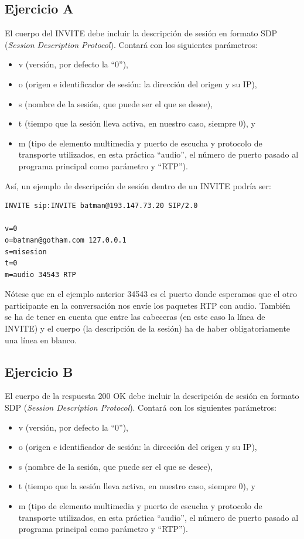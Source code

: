 \documentclass[a4paper,11pt]{article}
\begin{document}
\subsection*{Ejercicio A}

El cuerpo del INVITE debe incluir la descripción de sesión en formato SDP (\emph{Session Description Protocol}). Contará con los siguientes parámetros:

\begin{itemize}
  \item v (versión, por defecto la ``0''),
  \item o (origen e identificador de sesión: la dirección del origen y su IP),
  \item s (nombre de la sesión, que puede ser el que se desee),
  \item t (tiempo que la sesión lleva activa, en nuestro caso, siempre 0), y
  \item m (tipo de elemento multimedia y puerto de escucha y protocolo de transporte utilizados, en esta práctica ``audio'', el número de puerto pasado al programa principal como parámetro y ``RTP'').
\end{itemize}

Así, un ejemplo de descripción de sesión dentro de un INVITE podría ser:

\begin{verbatim}
INVITE sip:INVITE batman@193.147.73.20 SIP/2.0

v=0
o=batman@gotham.com 127.0.0.1
s=misesion
t=0
m=audio 34543 RTP
\end{verbatim}

Nótese que en el ejemplo anterior 34543 es el puerto donde esperamos que el otro participante en la conversación nos envíe los paquetes RTP con audio. También se ha de tener en cuenta que entre las cabeceras (en este caso la línea de INVITE) y el cuerpo (la descripción de la sesión) ha de haber obligatoriamente una línea en blanco.

\subsection*{Ejercicio B}

El cuerpo de la respuesta 200 OK debe incluir la descripción de sesión en formato SDP (\emph{Session Description Protocol}). Contará con los siguientes parámetros:

\begin{itemize}
  \item v (versión, por defecto la ``0''),
  \item o (origen e identificador de sesión: la dirección del origen y su IP),
  \item s (nombre de la sesión, que puede ser el que se desee),
  \item t (tiempo que la sesión lleva activa, en nuestro caso, siempre 0), y
  \item m (tipo de elemento multimedia y puerto de escucha y protocolo de transporte utilizados, en esta práctica ``audio'', el número de puerto pasado al programa principal como parámetro y ``RTP'').
\end{itemize}
\end{document}
